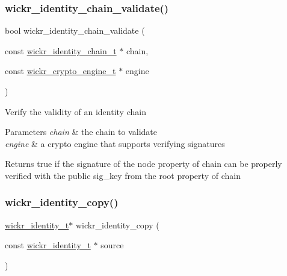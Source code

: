 \subsubsection{\texorpdfstring{wickr\+\_\+identity\+\_\+chain\+\_\+validate()}{wickr\_identity\_chain\_validate()}}
{\footnotesize\ttfamily bool wickr\+\_\+identity\+\_\+chain\+\_\+validate (\begin{DoxyParamCaption}\item[{const \mbox{\hyperlink{structwickr__identity__chain}{wickr\+\_\+identity\+\_\+chain\+\_\+t}} $\ast$}]{chain,  }\item[{const \mbox{\hyperlink{structwickr__crypto__engine}{wickr\+\_\+crypto\+\_\+engine\+\_\+t}} $\ast$}]{engine }\end{DoxyParamCaption})}

Verify the validity of an identity chain


\begin{DoxyParams}{Parameters}
{\em chain} & the chain to validate \\
\hline
{\em engine} & a crypto engine that supports verifying signatures \\
\hline
\end{DoxyParams}
\begin{DoxyReturn}{Returns}
true if the \textquotesingle{}signature\textquotesingle{} of the \textquotesingle{}node\textquotesingle{} property of \textquotesingle{}chain\textquotesingle{} can be properly verified with the public \textquotesingle{}sig\+\_\+key\textquotesingle{} from the \textquotesingle{}root\textquotesingle{} property of \textquotesingle{}chain\textquotesingle{} 
\end{DoxyReturn}
\mbox{\label{group__wickr__identity_ga14d1fb3ddd1dbd7797eb9b628eef99fe}} 
\subsubsection{\texorpdfstring{wickr\+\_\+identity\+\_\+copy()}{wickr\_identity\_copy()}}
{\footnotesize\ttfamily \mbox{\hyperlink{structwickr__identity}{wickr\+\_\+identity\+\_\+t}}$\ast$ wickr\+\_\+identity\+\_\+copy (\begin{DoxyParamCaption}\item[{const \mbox{\hyperlink{structwickr__identity}{wickr\+\_\+identity\+\_\+t}} $\ast$}]{source }\end{DoxyParamCaption})}


